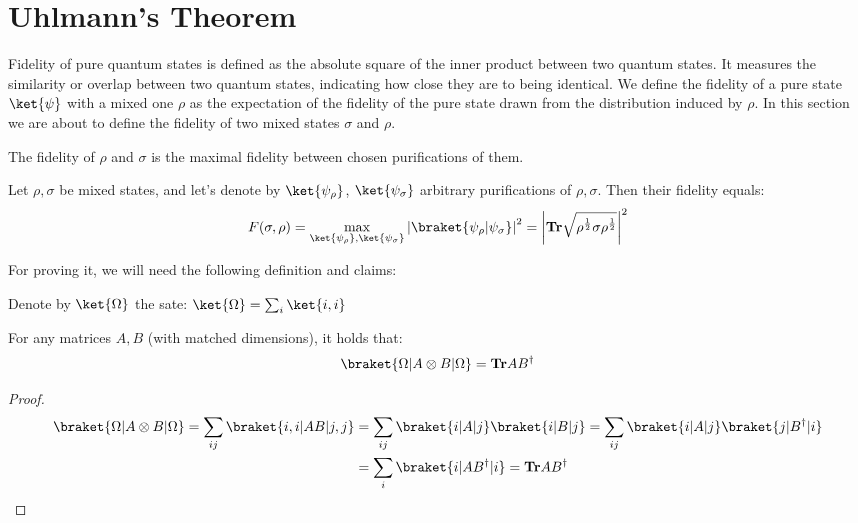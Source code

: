 \documentclass[12pt,a4paper]{article}
\begin{document}
\section{Uhlmann's Theorem}
Fidelity of pure quantum states is defined as the absolute square of the inner product between two quantum states. It measures the similarity or overlap between two quantum states, indicating how close they are to being identical. We define the fidelity of a pure state $\ket{\psi}$ with a mixed one $\rho$ as the expectation of the fidelity of the pure state drawn from the distribution induced by $\rho$. In this section we are about to define the fidelity of two mixed states $\sigma$ and $\rho$.
\begin{definition}
The fidelity of $\rho$ and $\sigma$ is the maximal fidelity between chosen purifications of them.
\end{definition}

\begin{theorem}
Let $\rho, \sigma$ be mixed states, and let's denote by $\ket{\psi_\rho}$, $\ket{\psi_\sigma}$ arbitrary purifications of $\rho, \sigma$. Then their fidelity equals:
  \begin{equation*}
    \begin{split}
      F(\sigma,\rho) = \max_{\ket{\psi_\rho}, \ket{\psi_\sigma}} \left| \braket{\psi_\rho|\psi_\sigma} \right|^2 =  \left|   \mathbf{Tr} \sqrt{      \rho^{\frac{1}{2}} \sigma \rho^{\frac{1}{2}}   }   \right|^{2}
    \end{split}
  \end{equation*}
\end{theorem}

For proving it, we will need the following definition and claims:
\begin{definition}
  Denote by $\ket{\Omega}$ the sate:  $\ket{\Omega}= \sum_{i}{\ket{i,i}}$
\end{definition}

\begin{claim} 
  \label{claim:Omg}
  For any matrices $A, B$ (with matched dimensions), it holds that:
  \begin{equation*}
    \begin{split}
    \braket{\Omega| A \otimes B  | \Omega} = \mathbf{Tr} AB^\dagger
    \end{split}
  \end{equation*}
\end{claim}
\begin{proof}
  \begin{equation*}
    \begin{split}
    \braket{\Omega| A \otimes B  | \Omega} = \sum_{ij}{ \braket{ i,i | AB | j ,j } } &=  \sum_{ij}{ \braket{ i| A | j} \braket{i | B | j } } =  \sum_{ij}{ \braket{ i| A | j} \braket{j | B^\dagger | i } } \\ 
      & = \sum_{i}{ \braket{i | A B^\dagger | i } } = \mathbf{Tr} AB^\dagger
    \end{split}
  \end{equation*}
\end{proof}
\end{document}
